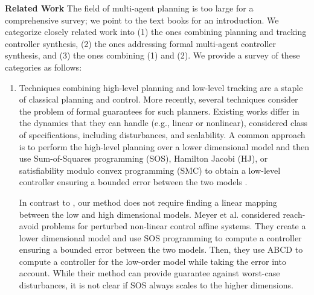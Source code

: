 
\noindent\textbf{Related Work}
%
The field of multi-agent planning is too large for a comprehensive survey; we point to the text books
\cite{LaValle2006,LaValle1998planning,choset2005principles,russel2010AIplanning} for an introduction.
We categorize closely related work into (1) the ones combining planning and tracking controller synthesis, 
(2) the ones addressing formal multi-agent controller synthesis, and 
(3) the ones combining (1) and (2). We provide a survey of these categories as follows:
%
\begin{enumerate}[(1)]
	\item Techniques combining high-level planning and low-level tracking are a staple of classical planning and control. 
More recently, several techniques consider the problem of formal guarantees for such planners.
Existing works differ in the dynamics that they can handle (e.g., linear or nonlinear),
considered class of specifications, including disturbances, and scalability. 
A common approach is to perform the high-level planning over a lower dimensional model and then use
Sum-of-Squares programming (SOS), Hamilton Jacobi (HJ), or satisfiability modulo convex programming (SMC) to obtain a low-level controller ensuring a bounded error between the 
two models \cite{herbert2017fastrack,meyer2019,singh2018robust,Nilsson:2018}. 

In contrast to \cite{herbert2017fastrack,singh2018robust}, our method does not require finding 
a linear mapping between the low and high dimensional models. Meyer et al. \cite{meyer2019} considered reach-avoid problems for perturbed non-linear control affine systems. They create a lower dimensional model and use SOS programming to compute a controller ensuring a bounded error between the two models. Then, they use ABCD to compute a controller for the low-order model while taking the error into account. While their method can provide guarantee against worst-case disturbances, it is not clear if SOS always scales to the higher dimensions.


\end{enumerate}

